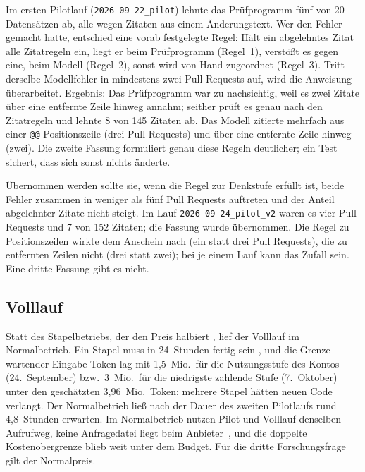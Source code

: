 \documentclass[11pt,a4paper]{report}
\begin{document}
Im ersten Pilotlauf (\texttt{2026-09-22\_pilot}) lehnte das Prüfprogramm
fünf von 20 Datensätzen ab, alle wegen Zitaten aus einem Änderungstext.
Wer den Fehler gemacht hatte, entschied eine vorab festgelegte Regel:
Hält ein abgelehntes Zitat alle Zitatregeln ein, liegt er beim
Prüfprogramm (Regel~1), verstößt es gegen eine, beim Modell (Regel~2),
sonst wird von Hand zugeordnet (Regel~3). Tritt derselbe Modellfehler in
mindestens zwei Pull Requests auf, wird die Anweisung überarbeitet.
Ergebnis: Das Prüfprogramm war zu nachsichtig, weil es zwei Zitate über
eine entfernte Zeile hinweg annahm; seither prüft es genau nach den
Zitatregeln und lehnte 8 von 145 Zitaten ab. Das Modell zitierte mehrfach
aus einer \texttt{@@}-Positionszeile (drei Pull Requests) und über eine
entfernte Zeile hinweg (zwei). Die zweite Fassung formuliert genau diese
Regeln deutlicher; ein Test sichert, dass sich sonst nichts änderte.

Übernommen werden sollte sie, wenn die Regel zur Denkstufe erfüllt ist,
beide Fehler zusammen in weniger als fünf Pull Requests auftreten und der
Anteil abgelehnter Zitate nicht steigt. Im Lauf
\texttt{2026-09-24\_pilot\_v2} waren es vier Pull Requests und 7 von 152
Zitaten; die Fassung wurde übernommen. Die Regel zu Positionszeilen wirkte
dem Anschein nach (ein statt drei Pull Requests), die zu entfernten Zeilen
nicht (drei statt zwei); bei je einem Lauf kann das Zufall sein. Eine
dritte Fassung gibt es nicht.

\subsection{Volllauf}
\label{subsec:impl-volllauf}

Statt des Stapelbetriebs, der den Preis halbiert
\cite[Abschn.~Overview]{openaibatch}, lief der Volllauf im
Normalbetrieb. Ein Stapel muss in 24~Stunden fertig sein
\cite[Abschn.~Batch expiration]{openaibatch}, und die Grenze wartender
Eingabe-Token \cite[Abschn.~Rate limits]{openaibatch} lag mit 1,5~Mio.\
für die Nutzungsstufe des Kontos (24.~September) bzw.\ 3~Mio.\ für die
niedrigste zahlende Stufe (7.~Oktober) \cite[Abschn.~Rate
limits]{openaiterra} unter den geschätzten 3,96~Mio.\ Token; mehrere
Stapel hätten neuen Code verlangt. Der Normalbetrieb ließ nach der Dauer
des zweiten Pilotlaufs rund 4,8~Stunden erwarten. Im Normalbetrieb nutzen Pilot und Volllauf
denselben Aufrufweg, keine Anfragedatei liegt beim
Anbieter~\cite[Abschn.~Storage requirements and retention controls per
endpoint]{openaiyourdata}, und die doppelte Kostenobergrenze blieb weit
unter dem Budget. Für die dritte Forschungsfrage gilt der
Normalpreis.
\end{document}
